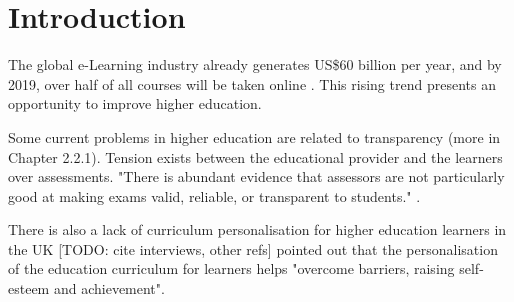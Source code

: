 
\chapter{Introduction}  %



The global e-Learning industry already generates US\$60 billion per year, and by 2019, over half of all courses will be taken 
online \citep[p.17]{panto2013challenge}. This rising trend presents an opportunity to improve higher education.

Some current problems in higher education are related to transparency (more in Chapter 2.2.1). Tension exists between 
the educational provider and the learners over assessments. "There is abundant evidence that assessors are not particularly 
good at making exams valid, reliable, or transparent to students." \citep[p.62]{brown1999assessment}.


There is also a lack of curriculum personalisation for higher education learners in the UK [TODO: cite interviews, other refs] 
\citet{condie2007impact} pointed out that the personalisation of the education curriculum for learners helps "overcome 
barriers, raising self-esteem and achievement". 

